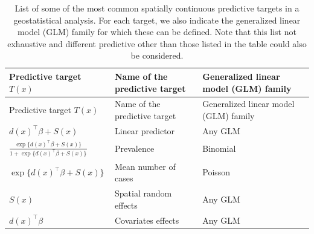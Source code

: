 \documentclass[
  letterpaper,
]{krantz}
\begin{document}
\begin{longtable}[]{@{}
  >{\raggedright\arraybackslash}p{}
  >{\raggedright\arraybackslash}p{}
  >{\raggedright\arraybackslash}p{}@{}}
\caption{List of some of the most common spatially continuous predictive
targets in a geostatistical analysis. For each target, we also indicate
the generalized linear model (GLM) family for which these can be
defined. Note that this list not exhaustive and different predictive
other than those listed in the table could also be
considered.}\label{tbl-spat-cont-pred-target}\tabularnewline
\toprule\noalign{}
\begin{minipage}[b]{\linewidth}\raggedright
Predictive target \(T(x)\)
\end{minipage} & \begin{minipage}[b]{\linewidth}\raggedright
Name of the predictive target
\end{minipage} & \begin{minipage}[b]{\linewidth}\raggedright
Generalized linear model (GLM) family
\end{minipage} \\
\midrule\noalign{}
\endfirsthead
\toprule\noalign{}
\begin{minipage}[b]{\linewidth}\raggedright
Predictive target \(T(x)\)
\end{minipage} & \begin{minipage}[b]{\linewidth}\raggedright
Name of the predictive target
\end{minipage} & \begin{minipage}[b]{\linewidth}\raggedright
Generalized linear model (GLM) family
\end{minipage} \\
\midrule\noalign{}
\endhead
\bottomrule\noalign{}
\endlastfoot
\(d(x)^\top \beta + S(x)\) & Linear predictor & Any GLM \\
\(\frac{\exp\{d(x)^\top \beta + S(x)\}}{1+\exp\{d(x)^\top \beta + S(x)\}}\)
& Prevalence & Binomial \\
\(\exp\{d(x)^\top \beta + S(x)\}\) & Mean number of cases & Poisson \\
\(S(x)\) & Spatial random effects & Any GLM \\
\(d(x)^\top \beta\) & Covariates effects & Any GLM \\
\end{longtable}
\end{document}
